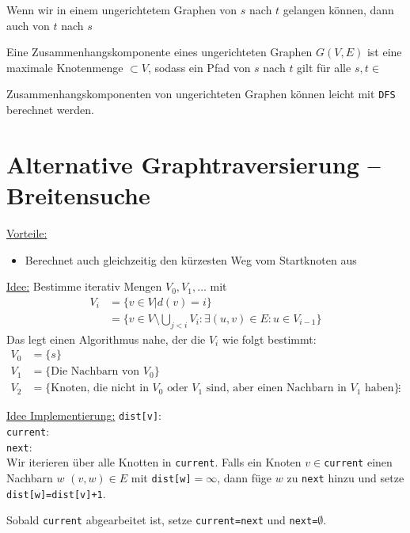\documentclass{mycourse}
\begin{document}
\begin{note}
Wenn wir in einem ungerichtetem Graphen von $s$ nach $t$ gelangen können, dann auch von $t$ nach $s$
\end{note}

\begin{df}
Eine Zusammenhangskomponente  eines ungerichteten Graphen $G(V,E)$ ist eine maximale Knotenmenge $\subset V$, sodass
ein Pfad von $s$ nach $t$ gilt für alle $s,t\in$
\begin{note}
Zusammenhangskomponenten von ungerichteten Graphen können leicht mit \verb|DFS| berechnet werden.
\end{note}
\end{df}

\section{Alternative Graphtraversierung – Breitensuche}

\underline{Vorteile:}
\begin{itemize}
\item Berechnet auch gleichzeitig den kürzesten Weg vom Startknoten aus
\end{itemize}
\underline{Idee:}
Bestimme iterativ Mengen $V_0,V_1,\dotsc$ mit
\begin{align*}
V_i&=\{v\in V|d(v)=i\}\\
&=\{v\in V\setminus \bigcup_{j<i}V_i : \exists (u,v)\in E : u\in V_{i-1}\}
\end{align*}
Das legt einen Algorithmus nahe, der die $V_i$ wie folgt bestimmt:
\begin{align*}
V_0&=\{s\}\\
V_1 &= \{\text{Die Nachbarn von $V_0$}\}\\
V_2 &= \{\text{Knoten, die nicht in $V_0$ oder $V_1$ sind, aber einen Nachbarn in $V_1$ haben}\}
&\vdots 
\end{align*}

\underline{Idee Implementierung:}
\verb|dist[v]|:\\
\verb|current|:\\
\verb|next|:\\

Wir iterieren über alle Knotten in \verb|current|.
Falls ein Knoten $v\in$\verb|current| einen Nachbarn $w$ $(v,w) \in E$ mit 
\verb|dist[w]|$=\infty$, dann füge $w$ zu \verb|next| hinzu und setze \verb|dist[w]=dist[v]+1|.

Sobald \verb|current| abgearbeitet ist, setze \verb|current=next| und \verb|next=|$\emptyset$.
\end{document}
